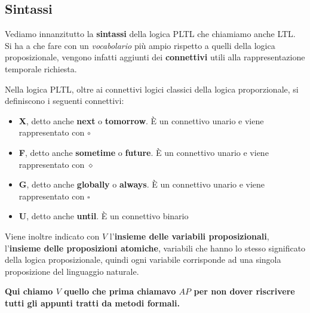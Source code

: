 \documentclass[a4paper,12pt, oneside]{book}
\begin{document}
\subsection{Sintassi}
Vediamo innanzitutto la \textbf{sintassi} della logica PLTL che chiamiamo anche
LTL.\\
Si ha a che fare con un \textit{vocabolario} più ampio rispetto a quelli della
logica proposizionale, vengono infatti aggiunti dei \textbf{connettivi} utili
alla rappresentazione temporale richiesta.
\begin{definizione}
  Nella logica PLTL, oltre ai connettivi logici classici della logica
  proporzionale, si definiscono i seguenti connettivi:
  \begin{itemize}
    \item \textbf{X}, detto anche \textbf{next} o \textbf{tomorrow}. È un
    connettivo unario e viene rappresentato con $\circ$
    \item \textbf{F}, detto anche \textbf{sometime} o \textbf{future}. È un
    connettivo unario e viene rappresentato con $\diamond$
    \item \textbf{G}, detto anche \textbf{globally} o \textbf{always}. È un
    connettivo unario e viene rappresentato con $\square$
    \item \textbf{U}, detto anche \textbf{until}. È un connettivo binario
  \end{itemize}
  Viene inoltre indicato con $V$ l'\textbf{insieme delle variabili
    proposizionali}, l'\textbf{insieme delle proposizioni atomiche},
  variabili che hanno lo stesso significato della logica
  proposizionale, quindi ogni variabile corrisponde ad una singola proposizione
  del linguaggio naturale. 
\end{definizione}
\textbf{Qui chiamo $V$ quello che prima chiamavo $AP$ per non dover riscrivere
  tutti gli appunti tratti da metodi formali.\\}
\end{document}
